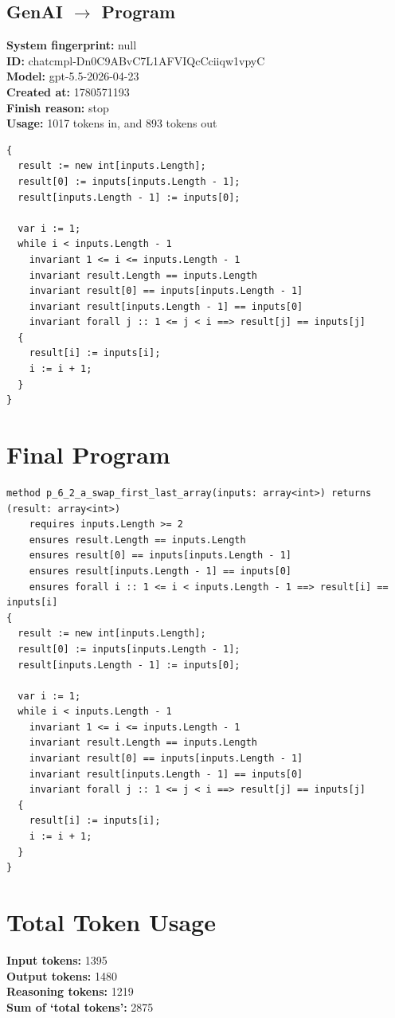 \documentclass{article}
\begin{document}
\subsection*{GenAI $\rightarrow$ Program}
\textbf{System fingerprint: }null
\\\textbf{ID: }chatcmpl-Dn0C9ABvC7L1AFVIQcCciiqw1vpyC
\\\textbf{Model: }gpt-5.5-2026-04-23
\\\textbf{Created at: }1780571193
\\\textbf{Finish reason: }stop
\\\textbf{Usage: }1017 tokens in, and 893 tokens out
\begin{lstlisting}
{
  result := new int[inputs.Length];
  result[0] := inputs[inputs.Length - 1];
  result[inputs.Length - 1] := inputs[0];

  var i := 1;
  while i < inputs.Length - 1
    invariant 1 <= i <= inputs.Length - 1
    invariant result.Length == inputs.Length
    invariant result[0] == inputs[inputs.Length - 1]
    invariant result[inputs.Length - 1] == inputs[0]
    invariant forall j :: 1 <= j < i ==> result[j] == inputs[j]
  {
    result[i] := inputs[i];
    i := i + 1;
  }
}
\end{lstlisting}
\section*{Final Program}
\begin{lstlisting}
method p_6_2_a_swap_first_last_array(inputs: array<int>) returns (result: array<int>)
	requires inputs.Length >= 2
	ensures result.Length == inputs.Length
	ensures result[0] == inputs[inputs.Length - 1]
	ensures result[inputs.Length - 1] == inputs[0]
	ensures forall i :: 1 <= i < inputs.Length - 1 ==> result[i] == inputs[i]
{
  result := new int[inputs.Length];
  result[0] := inputs[inputs.Length - 1];
  result[inputs.Length - 1] := inputs[0];

  var i := 1;
  while i < inputs.Length - 1
    invariant 1 <= i <= inputs.Length - 1
    invariant result.Length == inputs.Length
    invariant result[0] == inputs[inputs.Length - 1]
    invariant result[inputs.Length - 1] == inputs[0]
    invariant forall j :: 1 <= j < i ==> result[j] == inputs[j]
  {
    result[i] := inputs[i];
    i := i + 1;
  }
}
\end{lstlisting}
\section*{Total Token Usage}
\textbf{Input tokens: }1395
\\\textbf{Output tokens: }1480
\\\textbf{Reasoning tokens: }1219
\\\textbf{Sum of `total tokens': }2875
\end{document}
